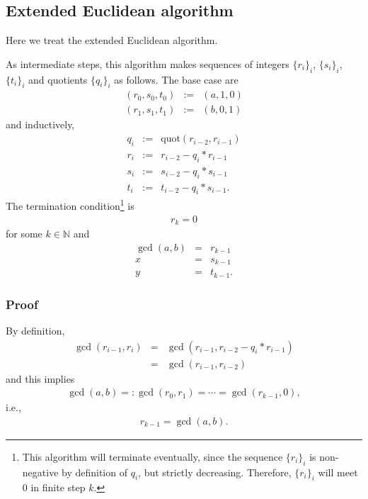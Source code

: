 \documentclass[11pt]{book}
\begin{document}
\subsection{Extended Euclidean algorithm}
\label{exGCD}
Here we treat the extended Euclidean algorithm.

As intermediate steps, this algorithm makes sequences of integers $\{r_i\}_i$, $\{s_i\}_i$, $\{t_i\}_i$ and quotients $\{q_i\}_i$ as follows.
The base case are
\begin{eqnarray}
\left(r_0, s_0, t_0 \right) &:=& (a,1,0) \\
\left(r_1, s_1, t_1 \right) &:=& (b,0,1) 
\end{eqnarray}
and inductively,
\begin{eqnarray}
q_i &:=& \text{quot}(r_{i-2}, r_{i-1}) \\
r_i &:=& r_{i-2} - q_i * r_{i-1} \\
s_i &:=& s_{i-2} - q_i * s_{i-1} \\
t_i &:=& t_{i-2} - q_i * s_{i-1}.
\end{eqnarray}
The termination condition\footnote{
This algorithm will terminate eventually, since the sequence $\{r_i\}_i$ is non-negative by definition of $q_i$, but strictly decreasing.
Therefore, $\{r_i\}_i$ will meet $0$ in finite step $k$.
} is
\begin{eqnarray}
r_k = 0
\end{eqnarray}
for some $k \in \mathbb{N}$ and
\begin{eqnarray}
\gcd(a,b) &=& r_{k-1} \\
x &=& s_{k-1} \\
y &=& t_{k-1}.
\end{eqnarray}

\subsubsection{Proof}
By definition,
\begin{eqnarray}
\gcd(r_{i-1}, r_i) &=& \gcd(r_{i-1}, r_{i-2} - q_i * r_{i-1}) \\
&=& \gcd(r_{i-1}, r_{i-2})
\end{eqnarray}
and this implies 
\begin{eqnarray}
\gcd(a,b) =: \gcd(r_0, r_1) = \cdots = \gcd(r_{k-1}, 0),
\end{eqnarray}
i.e., 
\begin{eqnarray}
r_{k-1} = \gcd(a,b).
\end{eqnarray}
\end{document}
